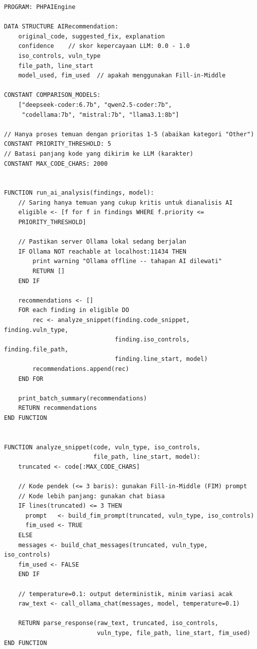 \begin{lstlisting}[style=pseudocodestyle]
PROGRAM: PHPAIEngine

DATA STRUCTURE AIRecommendation:
    original_code, suggested_fix, explanation
    confidence    // skor kepercayaan LLM: 0.0 - 1.0
    iso_controls, vuln_type
    file_path, line_start
    model_used, fim_used  // apakah menggunakan Fill-in-Middle

CONSTANT COMPARISON_MODELS:
    ["deepseek-coder:6.7b", "qwen2.5-coder:7b",
     "codellama:7b", "mistral:7b", "llama3.1:8b"]

// Hanya proses temuan dengan prioritas 1-5 (abaikan kategori "Other")
CONSTANT PRIORITY_THRESHOLD: 5
// Batasi panjang kode yang dikirim ke LLM (karakter)
CONSTANT MAX_CODE_CHARS: 2000


FUNCTION run_ai_analysis(findings, model):
    // Saring hanya temuan yang cukup kritis untuk dianalisis AI
    eligible <- [f for f in findings WHERE f.priority <= 
    PRIORITY_THRESHOLD]

    // Pastikan server Ollama lokal sedang berjalan
    IF Ollama NOT reachable at localhost:11434 THEN
        print warning "Ollama offline -- tahapan AI dilewati"
        RETURN []
    END IF

    recommendations <- []
    FOR each finding in eligible DO
        rec <- analyze_snippet(finding.code_snippet, finding.vuln_type,
                               finding.iso_controls, finding.file_path,
                               finding.line_start, model)
        recommendations.append(rec)
    END FOR

    print_batch_summary(recommendations)
    RETURN recommendations
END FUNCTION


FUNCTION analyze_snippet(code, vuln_type, iso_controls,
                         file_path, line_start, model):
    truncated <- code[:MAX_CODE_CHARS]

    // Kode pendek (<= 3 baris): gunakan Fill-in-Middle (FIM) prompt
    // Kode lebih panjang: gunakan chat biasa
    IF lines(truncated) <= 3 THEN
      prompt   <- build_fim_prompt(truncated, vuln_type, iso_controls)
      fim_used <- TRUE
    ELSE
    messages <- build_chat_messages(truncated, vuln_type, iso_controls)
    fim_used <- FALSE
    END IF

    // temperature=0.1: output deterministik, minim variasi acak
    raw_text <- call_ollama_chat(messages, model, temperature=0.1)

    RETURN parse_response(raw_text, truncated, iso_controls,
                          vuln_type, file_path, line_start, fim_used)
END FUNCTION



\end{lstlisting}
